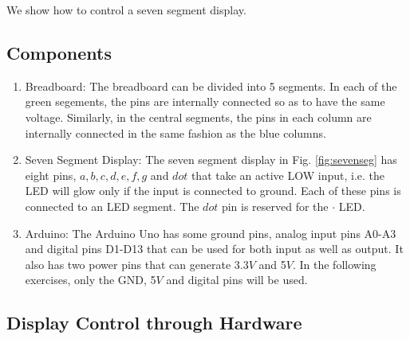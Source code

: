 We show how to control
a seven segment display.
\subsection{Components}
\begin{enumerate}[label=\arabic*.,ref=\theenumi]
\begin{table}[H]
	\centering

\caption{Components}
\label{table:components}
\end{table}
\item Breadboard:
The breadboard can be divided into 5 segments.  In each of the green segements, the pins are internally connected so as to have the same voltage.  Similarly, in the central segments, the pins in each column  are internally connected in the same fashion as the blue columns. 
\item Seven Segment Display:
The seven segment display in Fig. \ref{fig:sevenseg} has eight pins, $a, b, c, d, e, f, g$ and $dot$ that take an active LOW input, i.e.  the LED will glow only if the input is connected to ground.  Each of these pins is connected to an LED segment.  The $dot$ pin is  reserved for the $\cdot$ LED.  

\item Arduino:
The Arduino Uno has some ground pins, analog input pins A0-A3 and digital pins D1-D13 that can be used for both input as well as output. It also has two power pins that can generate 3.3$V$ and 5$V$.  In the following exercises, only the GND, 5$V$ and digital pins will be used.

\end{enumerate}

\subsection{Display Control through Hardware }
